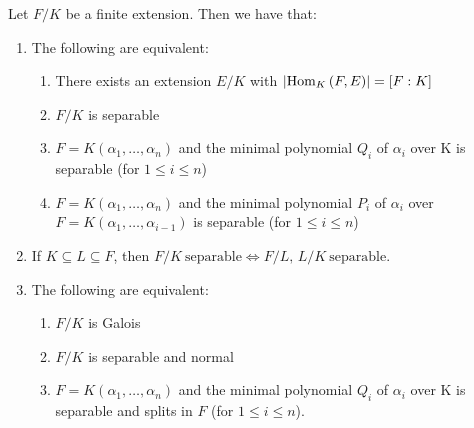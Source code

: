 \begin{theorem}
  \label{thm:77}
  Let $F/K$ be a finite extension. Then we have that:
  \begin{enumerate}
  \item The following are equivalent:
    \begin{enumerate}
    \item There exists an extension $E/K$ with $\left|\text{Hom}_{K}\left(F, E\right)\right| = [F : K]$
    \item $F/K$ is separable
    \item $F = K(\alpha_1, \ldots, \alpha_n)$ and the minimal polynomial $Q_i$ of $\alpha_i$ over K is separable (for $1 \leq i \leq n$)
    \item $F = K(\alpha_1, \ldots, \alpha_n)$ and the minimal polynomial $P_i$ of $\alpha_i$ over $F = K(\alpha_1, \ldots, \alpha_{i-1})$ is separable (for $1 \leq i \leq n$)
    \end{enumerate}
  \item If $K \subseteq L \subseteq F$, then $F/K \ \text{separable} \Leftrightarrow F/L, \, L/K \ \text{separable}$.
  \item The following are equivalent:
    \begin{enumerate}
    \item $F/K$ is Galois
    \item $F/K$ is separable and normal
    \item $F = K(\alpha_1, \ldots, \alpha_n)$ and the minimal polynomial $Q_i$ of $\alpha_i$ over K is separable and splits in $F$ (for $1 \leq i \leq n$).
    \end{enumerate}
  \end{enumerate}
\end{theorem}

